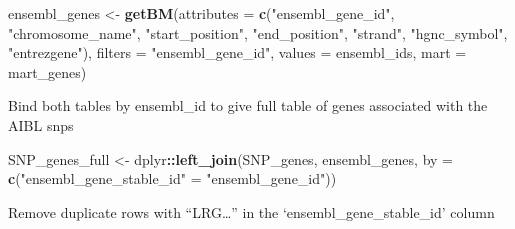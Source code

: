 \documentclass[]{article}
\newenvironment{Shaded}{\begin{snugshade}}{\end{snugshade}}
\newcommand{\KeywordTok}[1]{\textcolor[rgb]{0.13,0.29,0.53}{\textbf{#1}}}
\newcommand{\DataTypeTok}[1]{\textcolor[rgb]{0.13,0.29,0.53}{#1}}
\newcommand{\StringTok}[1]{\textcolor[rgb]{0.31,0.60,0.02}{#1}}
\newcommand{\CommentTok}[1]{\textcolor[rgb]{0.56,0.35,0.01}{\textit{#1}}}
\newcommand{\OperatorTok}[1]{\textcolor[rgb]{0.81,0.36,0.00}{\textbf{#1}}}
\newcommand{\NormalTok}[1]{#1}
\begin{document}
\begin{Shaded}
\end{Shaded}

\begin{Shaded}
\begin{Highlighting}[]
\NormalTok{ensembl_genes <-}\StringTok{ }\KeywordTok{getBM}\NormalTok{(}\DataTypeTok{attributes =} \KeywordTok{c}\NormalTok{(}\StringTok{"ensembl_gene_id"}\NormalTok{, }\StringTok{"chromosome_name"}\NormalTok{, }\StringTok{"start_position"}\NormalTok{, }\StringTok{"end_position"}\NormalTok{, }\StringTok{"strand"}\NormalTok{, }\StringTok{"hgnc_symbol"}\NormalTok{, }\StringTok{"entrezgene"}\NormalTok{),}
                       \DataTypeTok{filters =} \StringTok{"ensembl_gene_id"}\NormalTok{,}
                       \DataTypeTok{values =}\NormalTok{ ensembl_ids,}
                       \DataTypeTok{mart =}\NormalTok{ mart_genes)}
\end{Highlighting}
\end{Shaded}

Bind both tables by ensembl\_id to give full table of genes associated
with the AIBL snps

\begin{Shaded}
\begin{Highlighting}[]
\NormalTok{SNP_genes_full <-}\StringTok{ }\NormalTok{dplyr}\OperatorTok{::}\KeywordTok{left_join}\NormalTok{(SNP_genes, ensembl_genes, }\DataTypeTok{by =} \KeywordTok{c}\NormalTok{(}\StringTok{"ensembl_gene_stable_id"}\NormalTok{ =}\StringTok{ "ensembl_gene_id"}\NormalTok{))}
\end{Highlighting}
\end{Shaded}

Remove duplicate rows with ``LRG\ldots{}'' in the
`ensembl\_gene\_stable\_id' column

\begin{Shaded}
\end{Shaded}
\end{document}
